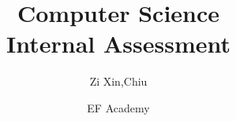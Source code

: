\documentclass[envcountsame,envcountchap]{svmono}
\begin{document}
\author{EF Academy}
\title{Computer Science\\ Internal Assessment\\
}
\subtitle{Zi Xin,Chiu}
\maketitle

\frontmatter%



\tableofcontents


\mainmatter%






\backmatter%


\printindex

\end{document}
